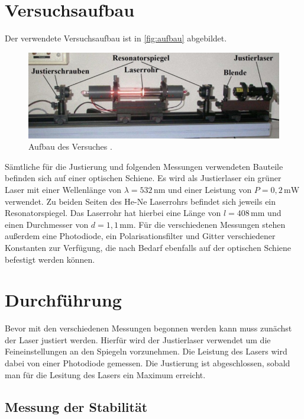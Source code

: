 \section{Versuchsaufbau}
\label{sec:Aufbau}

Der verwendete Versuchsaufbau ist in \autoref{fig:aufbau} abgebildet.

\begin{figure}[H]
    \centering
    \includegraphics[width=\textwidth]{data/Aufbau.jpg}
    \caption{Aufbau des Versuches \cite{Anleitung61}.}
    \label{fig:aufbau}
\end{figure}

\noindent
Sämtliche für die Justierung und folgenden Messungen verwendeten Bauteile befinden sich auf einer optischen Schiene. Es wird als Justierlaser ein grüner Laser mit einer
Wellenlänge von $\lambda = 532\, \si{\nano\metre}$ und einer Leistung von $P = 0,2\, \si{\milli\watt}$ verwendet. Zu beiden Seiten des He-Ne Laserrohrs befindet sich jeweils
ein Resonatorspiegel. Das Laserrohr hat hierbei eine Länge von $l = 408\, \si{\milli\metre}$ und einen Durchmesser von $d = 1,1\, \si{\milli\metre}$.
\noindent
Für die verschiedenen Messungen stehen außerdem eine Photodiode, ein Polarisationsfilter und Gitter verschiedener Konstanten zur Verfügung, die nach Bedarf ebenfalls auf der
optischen Schiene befestigt werden können. 


\section{Durchführung}
\label{sec:Durchführung}

Bevor mit den verschiedenen Messungen begonnen werden kann muss zunächst der Laser justiert werden. Hierfür wird der Justierlaser verwendet um die Feineinstellungen an
den Spiegeln vorzunehmen. Die Leistung des Lasers wird dabei von einer Photodiode gemessen. Die Justierung ist abgeschlossen, sobald man für die Lesitung des Lasers ein
Maximum erreicht.


\subsection{Messung der Stabilität}

